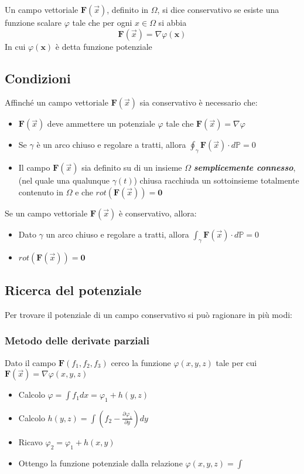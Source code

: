 \documentclass[10pt,a4paper]{report}
\newcommand{\pdv}[3]{\frac{\partial^{#2} #1}{\partial #3^{#2}}}
\begin{document}
			Un campo vettoriale $ \mathbf{F}(\vec{x}) $, definito in $ \Omega $, si dice conservativo se 
			esiste una funzione scalare $ \varphi $ tale che per ogni $ x \in \Omega $ si abbia \[ \mathbf{F}(\vec{x}) = \nabla \varphi(\mathbf{x})\] In cui $ \varphi(\mathbf{x}) $ è detta funzione potenziale
			
			\subsection*{Condizioni}
			Affinché un campo vettoriale $ \mathbf{F}(\vec{x}) $ sia conservativo è necessario che:
			\begin{itemize}
                \item $ \mathbf{F}(\vec{x}) $ deve ammettere un potenziale $ \varphi $ tale che $ \mathbf{F}(\vec{x})= \nabla \varphi$
				\item Se $ \gamma $ è un arco chiuso e regolare a tratti, allora $ \oint_{\gamma } \mathbf{F}(\vec{x}) \cdot d\mathbb{P}  =  0$
				\item Il campo $ \mathbf{F}(\vec{x}) $ sia definito su di un insieme $ \Omega $ \textit{\textbf{semplicemente connesso}}, (nel quale una qualunque $ \gamma(t) $) chiusa racchiuda un sottoinsieme totalmente contenuto in $ \Omega $ e che $ rot(\mathbf{F}(\vec{x})) = \textbf{0} $ 
			\end{itemize}
			Se un campo vettoriale $ \mathbf{F}(\vec{x}) $ è conservativo, allora:
			\begin{itemize}
				\item Dato $ \gamma $ un arco chiuso e regolare a tratti, allora $ \int_{\gamma } \mathbf{F}(\vec{x}) \cdot d\mathbb{P}  =  0$
				\item $ rot(\mathbf{F}(\vec{x})) = \textbf{0} $
			\end{itemize}
		
			\subsection*{Ricerca del potenziale}
			Per trovare il potenziale di un campo conservativo si può ragionare in più modi:

                \subsubsection{Metodo delle derivate parziali}
                    Dato il campo $ \mathbf{F}(f_{1},f_{2},f_{3}) $ cerco la funzione $ \varphi(x,y,z) $ tale per cui $ \mathbf{F}(\vec{x}) = \nabla \varphi(x,y,z) $
                \begin{itemize}
                    \item Calcolo $ \varphi = \int f_{1} dx = \varphi_{1} + h(y,z)$
                    \item Calcolo $ h(y,z) = \int (f_{2} - \pdv{\varphi_{1}}{}{y})dy$
                    \item Ricavo $ \varphi_{2} = \varphi_{1} + h(x,y) $
                    \item Ottengo la funzione potenziale  dalla relazione $\varphi(x,y,z) = \int  $  
                \end{itemize} 
				
\end{document}
